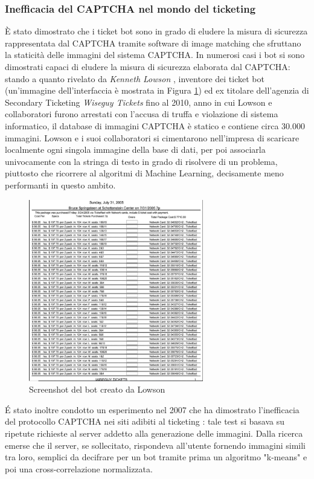 \subsubsection{Inefficacia del CAPTCHA nel mondo del ticketing}
\`E stato dimostrato che i ticket bot sono in grado di eludere la misura di sicurezza rappresentata dal CAPTCHA tramite software di image matching che sfruttano la staticità delle immagini del sistema CAPTCHA.
In numerosi casi i bot si sono dimostrati capaci di eludere la misura di sicurezza elaborata dal CAPTCHA: stando a quanto rivelato da \textit{Kenneth Lowson} \cite{vicelowson}, inventore dei ticket bot (un'immagine dell'interfaccia è mostrata in Figura \ref{bot1}) ed ex titolare dell'agenzia di Secondary Ticketing \textit{Wiseguy Tickets} fino al 2010, anno in cui Lowson e collaboratori furono arrestati con l'accusa di truffa e violazione di sistema informatico, il database di immagini CAPTCHA è statico e contiene circa 30.000 immagini. Lowson e i suoi collaboratori si cimentarono nell'impresa di scaricare localmente ogni singola immagine della base di dati, per poi associarla univocamente con la stringa di testo in grado di risolvere di un problema, piuttosto che ricorrere al algoritmi di Machine Learning, decisamente meno performanti in questo ambito. 
\begin{figure}[H]
	\centering
	\includegraphics[width=0.68\textwidth]{chapter4/immagini/bot1}
	\caption{Screenshot del bot creato da Lowson}
	\label{bot1}
\end{figure} 
\'E stato inoltre condotto un esperimento nel 2007 che ha dimostrato l'inefficacia del protocollo CAPTCHA nei siti adibiti al ticketing \cite{caine2007ai}: tale test si basava su ripetute richieste al server addetto alla generazione delle immagini. Dalla ricerca emerse che il server, se sollecitato, rispondeva all'utente fornendo immagini simili tra loro, semplici da decifrare per un bot tramite prima un algoritmo "k-means" e poi una cross-correlazione normalizzata. 
